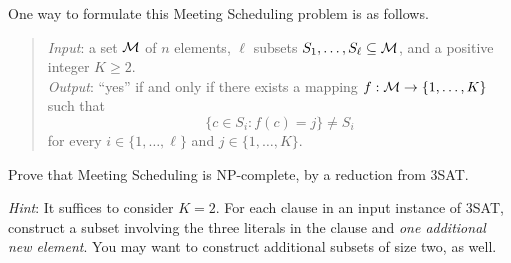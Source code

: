 \documentclass[11pt]{article}
\newcommand{\TO}{,\ldots,}
\begin{document}
\begin{enumerate}
One way to formulate this {\sc Meeting Scheduling} problem is as follows. 
\begin{quote}
{\em Input\/}: a set $\cal M$ of $n$ elements, 
$\ell$ subsets $S_1\TO S_{\ell} \subseteq {\cal M}$,
and a positive integer $K \geq 2$.\\[2pt]
{\em Output\/}: ``yes'' if and only if there exists a
mapping $f: {\cal M}\rightarrow\{1\TO K\}$ such that
\[ \{c\in S_i: f(c)=j\} \neq S_i\] for every $i\in\{1\TO\ell\}$
and $j\in\{1\TO K\}$.
\end{quote}

Prove  that {\sc Meeting Scheduling} is NP-complete, by a reduction from
{\sc 3SAT}.  

{\em Hint\/}: It suffices to consider $K=2$.
For each clause in an input instance of {\sc 3SAT},
construct a subset involving the three literals in the clause and
\emph{one additional new element}.  You may want to construct additional 
subsets of size two, as well.


\end{enumerate}
\end{document}
